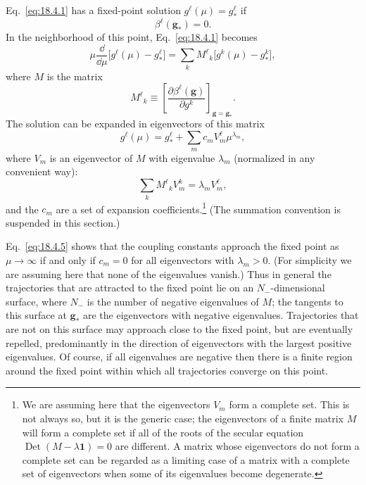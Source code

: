 Eq.~\eqref{eq:18.4.1} has a fixed-point solution $g^\ell(\mu)=g_*^\ell$ if
\begin{equation}
\beta^\ell(\mathbf{g}_*)=0.
\tag{18.4.2}\label{eq:18.4.2}
\end{equation}
In the neighborhood of this point, Eq.~\eqref{eq:18.4.1} becomes
\begin{equation}
\mu\frac{\dd}{\dd\mu}\bigl[g^\ell(\mu)-g_*^\ell\bigr]
=\sum_k M^\ell{}_k\bigl[g^k(\mu)-g_*^k\bigr],
\tag{18.4.3}\label{eq:18.4.3}
\end{equation}
where $M$ is the matrix
\begin{equation}
M^\ell{}_k\equiv\left[\frac{\partial\beta^\ell(\mathbf{g})}{\partial g^k}\right]_{\mathbf{g}=\mathbf{g}_*}.
\tag{18.4.4}\label{eq:18.4.4}
\end{equation}
The solution can be expanded in eigenvectors of this matrix
\begin{equation}
g^\ell(\mu)=g_*^\ell+\sum_m c_m V_m^\ell\mu^{\lambda_m},
\tag{18.4.5}\label{eq:18.4.5}
\end{equation}
where $V_m$ is an eigenvector of $M$ with eigenvalue $\lambda_m$ (normalized in any convenient way):
\begin{equation}
\sum_k M^\ell{}_k V_m^k=\lambda_m V_m^\ell,
\tag{18.4.6}\label{eq:18.4.6}
\end{equation}
and the $c_m$ are a set of expansion coefficients.\footnote{We are assuming here that the eigenvectors $V_m$ form a complete set. This is not always so, but it is the generic case; the eigenvectors of a finite matrix $M$ will form a complete set if all of the roots of the secular equation $\operatorname{Det}(M-\lambda\mathbf{1})=0$ are different. A matrix whose eigenvectors do not form a complete set can be regarded as a limiting case of a matrix with a complete set of eigenvectors when some of its eigenvalues become degenerate.} (The summation convention is suspended in this section.)

Eq.~\eqref{eq:18.4.5} shows that the coupling constants approach the fixed point as $\mu\to\infty$ if and only if $c_m=0$ for all eigenvectors with $\lambda_m>0$. (For simplicity we are assuming here that none of the eigenvalues vanish.) Thus in general the trajectories that are attracted to the fixed point lie on an $N_-$-dimensional surface, where $N_-$ is the number of negative eigenvalues of $M$; the tangents to this surface at $\mathbf{g}_*$ are the eigenvectors with negative eigenvalues. Trajectories that are not on this surface may approach close to the fixed point, but are eventually repelled, predominantly in the direction of eigenvectors with the largest positive eigenvalues. Of course, if all eigenvalues are negative then there is a finite region around the fixed point within which all trajectories converge on this point.

